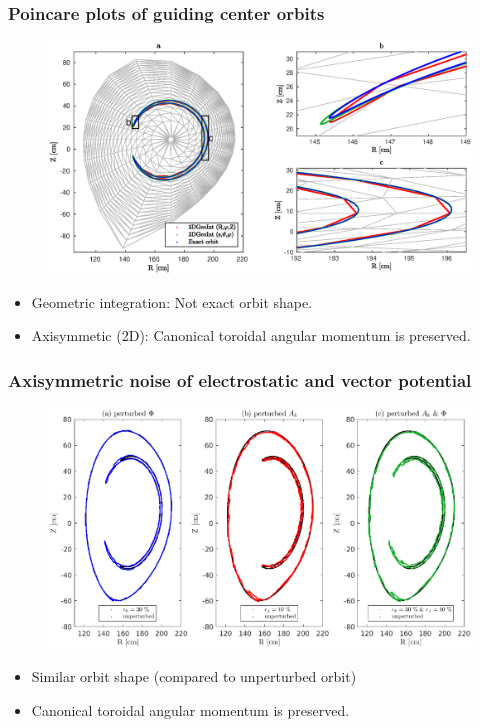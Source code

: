 \documentclass{beamer}
\begin{document}
\begin{frame}
\frametitle{Poincare plots of guiding center orbits}
\vspace{-1.1cm}
\begin{figure}
	\hspace*{-0.9cm}\includegraphics[width=1.0\textwidth]{FIGURES/orbit_plot.eps}
\end{figure}
\begin{itemize}
	\vspace*{-0.5cm}
\item Geometric integration: Not exact orbit shape.
\item Axisymmetic (2D): Canonical toroidal angular momentum is preserved.
\end{itemize}
\end{frame}

\begin{frame}
\frametitle{Axisymmetric noise of electrostatic and vector potential}
\vspace{-0.4cm}
\begin{figure}
	\hspace*{-1.05cm}\includegraphics[width=1.0\textwidth]{FIGURES/axissymetric_noise.eps}
\end{figure}
\begin{itemize}
	\vspace*{-0.6cm}
	\item Similar orbit shape (compared to unperturbed orbit)
	\item Canonical toroidal angular momentum is preserved.
\end{itemize}
\end{frame}
\end{document}
